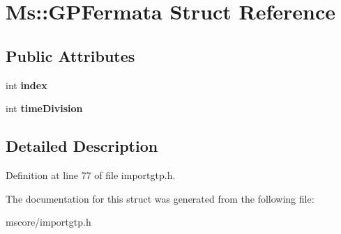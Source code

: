 \hypertarget{struct_ms_1_1_g_p_fermata}{}\section{Ms\+:\+:G\+P\+Fermata Struct Reference}
\label{struct_ms_1_1_g_p_fermata}
\subsection*{Public Attributes}
\begin{DoxyCompactItemize}
\item 
\mbox{\label{struct_ms_1_1_g_p_fermata_a0fee99fec0a45ca53b6ee1dab68b3cee}} 
int {\bfseries index}
\item 
\mbox{\label{struct_ms_1_1_g_p_fermata_a5e25eddeda2b33134199ff83a2bd50ee}} 
int {\bfseries time\+Division}
\end{DoxyCompactItemize}


\subsection{Detailed Description}


Definition at line 77 of file importgtp.\+h.



The documentation for this struct was generated from the following file\+:\begin{DoxyCompactItemize}
\item 
mscore/importgtp.\+h\end{DoxyCompactItemize}
